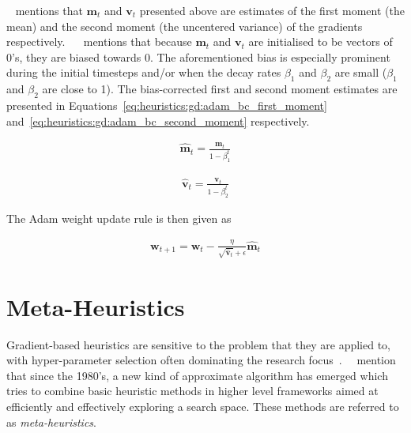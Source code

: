\citeauthor{ref:ruder:2016}~\cite{ref:ruder:2016} mentions that $\boldsymbol{m}_{t}$ and $\boldsymbol{v}_{t}$ presented above are estimates of the first moment (the mean) and the second moment (the uncentered variance) of the gradients respectively. ~\citeauthor{ref:kingma:2014}~\cite{ref:kingma:2014} mentions that because $\boldsymbol{m}_{t}$ and $\boldsymbol{v}_{t}$ are initialised to be vectors of 0's, they are biased towards 0. The aforementioned bias is especially prominent during the initial timesteps and/or when the decay rates $\beta_{1}$ and $\beta_{2}$ are small ($\beta_{1}$ and $\beta_{2}$ are close to 1). The bias-corrected first and second moment estimates are presented in Equations~\eqref{eq:heuristics:gd:adam_bc_first_moment} and~\eqref{eq:heuristics:gd:adam_bc_second_moment} respectively.

\begin{equation}
      \label{eq:heuristics:gd:adam_bc_first_moment}
      \begin{split}
            \hat{\boldsymbol{m}}_{t} = \frac{\boldsymbol{m}_{t}}{1 - \beta^{t}_{1}}
      \end{split}
\end{equation}

\begin{equation}
      \label{eq:heuristics:gd:adam_bc_second_moment}
      \begin{split}
            \hat{\boldsymbol{v}}_{t} = \frac{\boldsymbol{v}_{t}}{1 - \beta^{t}_{2}}
      \end{split}
\end{equation}

The \acs{Adam} weight update rule is then given as

\begin{equation}
      \label{eq:heuristics:gd:adam}
      \begin{split}
            \boldsymbol{w}_{t+1} = \boldsymbol{w}_{t} - \frac{\eta}{\sqrt{\hat{\boldsymbol{v}}_{t}} + \epsilon}\hat{\boldsymbol{m}}_{t}
      \end{split}
\end{equation}

\section{Meta-Heuristics}\label{sec:heuristics:mh}

Gradient-based heuristics are sensitive to the problem that they are applied to, with hyper-parameter selection often dominating the research focus~\cite{ref:bengio:2000, ref:feurer:2019}.~\citeauthor{ref:blum:2003}~\cite{ref:blum:2003} mention that since the 1980's, a new kind of approximate algorithm has emerged which tries to combine basic heuristic methods in higher level frameworks aimed at efficiently and effectively exploring a search space. These methods are referred to as \textit{meta-heuristics}.

